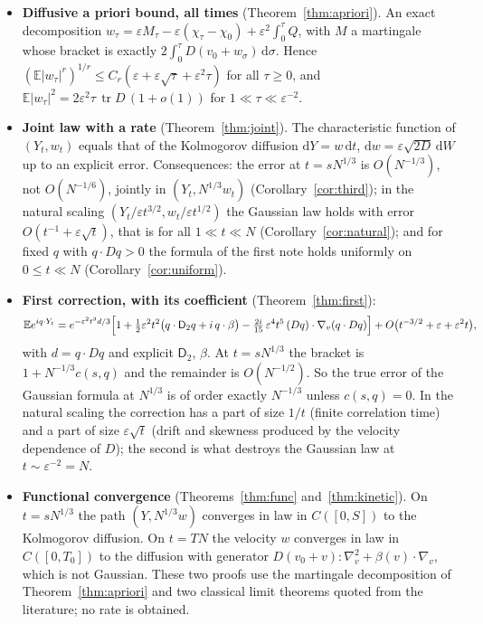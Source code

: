 \documentclass[11pt]{article}
\newcommand{\dd}{\mathrm{d}}
\newcommand{\E}{\mathbb{E}}
\newcommand{\eps}{\varepsilon}
\newcommand{\sD}{\mathsf{D}}
\newcommand{\tr}{\operatorname{tr}}
\theoremstyle{remark}
\begin{document}
\begin{itemize}
  \item \textbf{Diffusive a priori bound, all times}
    (Theorem~\ref{thm:apriori}). An exact decomposition
    $w_\tau = \eps M_\tau - \eps(\chi_\tau-\chi_0) + \eps^2\int_0^\tau Q$,
    with $M$ a martingale whose bracket is exactly
    $2\int_0^\tau D(v_0+w_\sigma)\,\dd\sigma$. Hence
    $(\E|w_\tau|^r)^{1/r}\le C_r(\eps + \eps\sqrt\tau + \eps^2\tau)$ for all
    $\tau\ge0$, and $\E|w_\tau|^2 = 2\eps^2\tau\,\tr D\,(1+o(1))$ for
    $1\ll\tau\ll\eps^{-2}$.
  \item \textbf{Joint law with a rate} (Theorem~\ref{thm:joint}). The
    characteristic function of $(Y_t,w_t)$ equals that of the Kolmogorov
    diffusion $\dd Y = w\,\dd t$, $\dd w = \eps\sqrt{2D}\,\dd W$ up to an
    explicit error. Consequences: the error at $t = sN^{1/3}$ is
    $O(N^{-1/3})$, not $O(N^{-1/6})$, jointly in $(Y_t, N^{1/3}w_t)$
    (Corollary~\ref{cor:third}); in the natural scaling
    $(Y_t/\eps t^{3/2}, w_t/\eps t^{1/2})$ the Gaussian law holds with error
    $O(t^{-1} + \eps\sqrt t)$, that is for all $1\ll t\ll N$
    (Corollary~\ref{cor:natural}); and for fixed $q$ with $q\cdot Dq>0$ the
    formula of the first note holds uniformly on $0\le t\ll N$
    (Corollary~\ref{cor:uniform}).
  \item \textbf{First correction, with its coefficient}
    (Theorem~\ref{thm:first}):
    \[
      \E e^{iq\cdot Y_t} = e^{-\eps^2t^3d/3}\Bigl[1
        + \tfrac12\eps^2t^2\bigl(q\cdot\sD_2q + i\,q\cdot\beta\bigr)
        - \tfrac{2i}{15}\,\eps^4t^5\,(Dq)\cdot\nabla_v(q\cdot Dq)\Bigr]
        + O\bigl(t^{-3/2} + \eps + \eps^2t\bigr),
    \]
    with $d = q\cdot Dq$ and explicit $\sD_2$, $\beta$. At $t = sN^{1/3}$ the
    bracket is $1 + N^{-1/3}c(s,q)$ and the remainder is $O(N^{-1/2})$. So
    the true error of the Gaussian formula at $N^{1/3}$ is of order exactly
    $N^{-1/3}$ unless $c(s,q)=0$. In the natural scaling the correction has a
    part of size $1/t$ (finite correlation time) and a part of size
    $\eps\sqrt t$ (drift and skewness produced by the velocity dependence of
    $D$); the second is what destroys the Gaussian law at $t\sim\eps^{-2}=N$.
  \item \textbf{Functional convergence} (Theorems~\ref{thm:func}
    and~\ref{thm:kinetic}). On $t = sN^{1/3}$ the path
    $(Y, N^{1/3}w)$ converges in law in $C([0,S])$ to the Kolmogorov
    diffusion. On $t = TN$ the velocity $w$ converges in law in $C([0,T_0])$
    to the diffusion with generator $D(v_0+v):\nabla_v^2 + \beta(v)\cdot\nabla_v$,
    which is not Gaussian. These two proofs use the martingale decomposition
    of Theorem~\ref{thm:apriori} and two classical limit theorems quoted from
    the literature; no rate is obtained.
\end{itemize}
\end{document}
